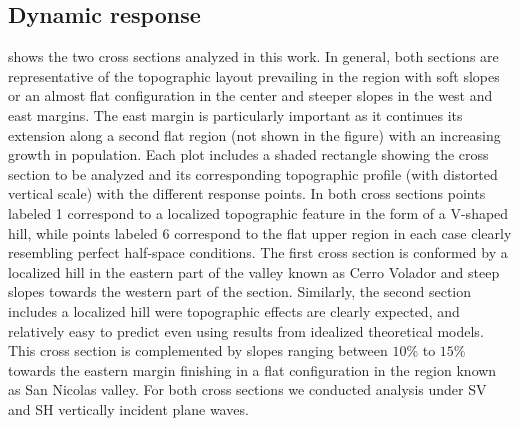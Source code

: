 \documentclass[11pt,letterpaper]{article}
\begin{document}
\subsection*{Dynamic response}
 shows the two cross sections analyzed in this work. In general, both sections are representative of the topographic layout prevailing in the region with soft slopes or an almost flat configuration in the center and steeper slopes in the west and east margins. The east margin is particularly important as it continues its extension along a second flat region (not shown in the figure) with an increasing growth in population. Each plot includes  a shaded rectangle showing the cross section to be analyzed and its corresponding topographic profile (with distorted vertical scale) with the different response points. In both cross sections points labeled 1 correspond to a localized topographic feature in the form of a V-shaped hill, while points labeled 6 correspond to the flat upper region in each case clearly resembling perfect half-space conditions. The first cross section is conformed by a localized hill in the eastern part of the valley known as Cerro Volador and steep slopes towards the western part of the section. Similarly, the second section includes a localized hill were topographic effects are clearly expected, and relatively easy to predict even using results from idealized theoretical models. This cross section is complemented by slopes ranging between $10\%$ to $15\%$ towards the eastern margin finishing in a flat configuration in the region known as San Nicolas valley. For both cross sections we conducted analysis under SV and SH vertically incident plane waves.
\end{document}
